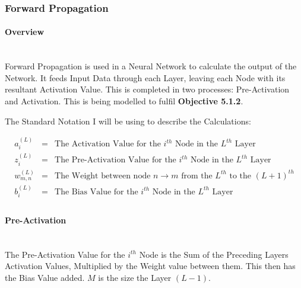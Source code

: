 \begin{flushleft}
            \subsubsection{Forward Propagation}
                \paragraph{Overview} \mbox{} \\
                    \vspace{0.2cm}
                    Forward Propagation is used in a Neural Network to calculate the output of the Network. It feeds Input Data through each
                    Layer, leaving each Node with its resultant Activation Value. This is completed in two processes: Pre-Activation and Activation. 
                    This is being modelled to fulfil \textbf{Objective 5.1.2}.\\
                    \vspace{0.4cm}
                    \centerline{The Standard Notation I will be using to describe the Calculations:}

                    \begin{addmargin}[2em]{0em}        
                        \begin{eqnarray*}
                            a^{(L)}_{i} &=&  \text{The Activation Value for the $i^{th}$ Node in the $L^{th}$ Layer} \\
                            z^{(L)}_{i} &=&  \text{The Pre-Activation Value for the $i^{th}$ Node in the $L^{th}$ Layer} \\
                            w^{(L)}_{m,n} &=&  \text{The Weight between node $n \rightarrow m$ from the $L^{th}$ to the $(L + 1)^{th}$} \\
                            b^{(L)}_{i} &=& \text{The Bias Value for the $i^{th}$ Node in the $L^{th}$ Layer} \\
                        \end{eqnarray*}             
                    \end{addmargin}
                    \vspace{0.4cm}

                \paragraph{Pre-Activation} \mbox{} \\
                    \vspace{0.2cm}
                    The Pre-Activation Value for the $i^{th}$ Node is the Sum of the Preceding Layers Activation Values, Multiplied by the Weight value
                    between them. This then has the Bias Value added. $M$ is the size the Layer $(L - 1)$.


\end{flushleft}
